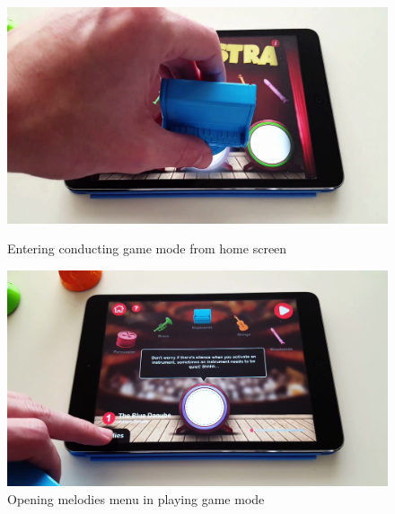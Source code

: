 \begin{figure}[ht!]
  \centering
  \includegraphics[width=350pt]{graphics/game-play/enter_conducting_mode.png}
  \vspace{0.05cm}
  \caption{Entering conducting game mode from home screen}
  \vspace{1cm}

  \includegraphics[width=350pt]{graphics/game-play/choose_melody_conducting.png}
  \vspace{0.05cm}
  \caption{Opening melodies menu in playing game mode}
\end{figure}

